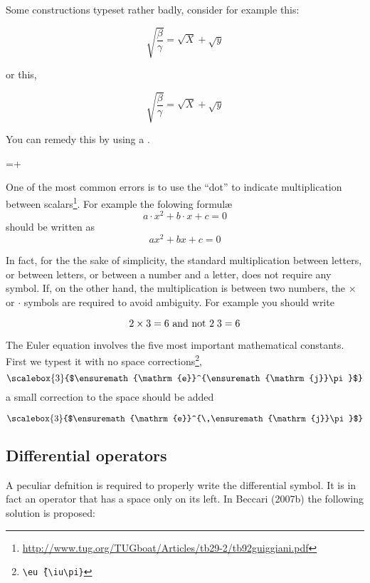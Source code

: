 {

Some \tex constructions typeset rather badly, consider for example this:

\[
\sqrt{\frac{\beta}{\gamma}} = \sqrt{X} + \sqrt{y}
\]

\noindent or this,

\[
\surd{\frac{\beta}{\gamma}} = \surd{X} + \surd{y}
\]


You can remedy this by using a .


\begin{teXX}
=+
\end{teXX}


One of the most common errors is to use the ``dot'' to indicate multiplication between scalars\footnote{\url{http://www.tug.org/TUGboat/Articles/tb29-2/tb92guiggiani.pdf}}. For example the folowing formul\ae
\[a\cdot x^2+b\cdot x+c=0\]
should be written as
\[ax^2+bx+c=0\]

In fact, for the the sake of simplicity, the standard multiplication between letters, or between letters, or between a number and a letter, does not require any symbol. If, on the other hand, the multiplication is between two numbers, the $\times$ or $\cdot$ symbols are required to avoid ambiguity.
For example you should write

\[2\times 3=6 \text{ and not } 2\thickspace 3=6 \]



The Euler equation involves the five most important mathematical constants. First we typest it with no space corrections\footnote{\texttt{\textbackslash eu\^\,\{\textbackslash iu\textbackslash pi\}}},
\providecommand*{\eu}%
{\ensuremath{\mathrm{e}}}
\providecommand*{\iu}%
{\ensuremath{\mathrm{j}}}
\[\scalebox{3}{$\eu^{\iu\pi}$}\]
a small correction to the space should be added

\[\scalebox{3}{$\eu^{\,\iu\pi}$}\]

\subsection{Differential operators}
A peculiar defnition is required to properly
write the differential symbol. It is in fact an operator that has a space only on its left. In Beccari (2007b) the following solution is proposed:

}

